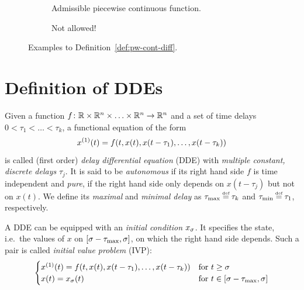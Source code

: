     \begin{figure}[t]\centering
        \begin{subfigure}[t]{0.48\textwidth}
            \centering
            
            \caption{Admissible piecewise continuous function.}
            \label{fig:allowed}
        \end{subfigure}
        \hfill
        \begin{subfigure}[t]{0.48\textwidth}
            \centering
            
            \caption{Not allowed!}
            \label{fig:not-allowed}
        \end{subfigure}
        \caption{Examples to Definition~\ref{def:pw-cont-diff}.}
    \end{figure}


\section{Definition of DDEs}
    \label{sec:definition-dde}

    \cite{Roussel04DDEs}

    \begin{definition}\label{def:dde}
        Given a function $f\colon\mathbb{R}\times\mathbb{R}^n\times\ldots\times\mathbb{R}^n\to\mathbb{R}^n$ and a set of time delays $0<\tau_1<\ldots<\tau_k$, a functional equation of the form
        \begin{equation}\label{eq:dde}
            \D{x}(t) = f(t,x(t),x(t-\tau_1),\ldots,x(t-\tau_k))
        \end{equation}
        is called (first order) \emph{delay differential equation} (DDE) with \emph{multiple constant, discrete delays} $\tau_j$.
        It is said to be \emph{autonomous} if its right hand side $f$ is time independent and \emph{pure}, if the right hand side only depends on $x(t-\tau_j)$ but not on $x(t)$.
        We define its \emph{maximal} and \emph{minimal delay} as $\taumax\defeq\tau_k$ and $\taumin\defeq\tau_1$, respectively.

        A DDE can be equipped with an \emph{initial condition} $x_{\sigma}$. It specifies the state, i.e.\ the values of $x$ on $[\sigma-\tau_{\max}, \sigma]$, on which the right hand side depends.
        Such a pair is called \emph{initial value problem} (IVP):
        \begin{equation}\label{eq:ivp}
            \begin{cases}
                \D{x}(t) = f(t,x(t),x(t-\tau_1),\ldots,x(t-\tau_k)) & \text{for } t\geq\tzero\\
                x(t) = x_{\tzero}(t) & \text{for } t\in\compactum{\tzero-\taumax}{\tzero}
            \end{cases}
        \end{equation}
    \end{definition}

